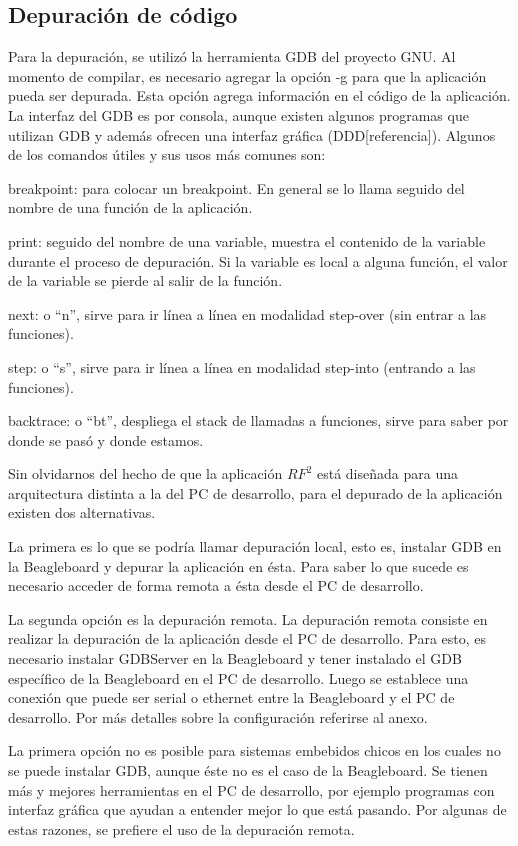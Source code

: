 \subsection{Depuración de código}
Para la depuración, se utilizó la herramienta GDB del proyecto GNU. 
Al momento de compilar, es necesario agregar la opción -g para que la aplicación pueda ser depurada. Esta opción agrega información en el código de la aplicación.
La interfaz del GDB es por consola, aunque existen algunos programas que utilizan GDB y además ofrecen una interfaz gráfica (DDD[referencia]).
Algunos de los comandos útiles y sus usos más comunes son: 

\bigskip
breakpoint: para colocar un breakpoint. En general se lo llama seguido del nombre de una función de la aplicación.

print: seguido del nombre de una variable, muestra el contenido de la variable durante el proceso de depuración. Si la variable es local a alguna función, el valor de la variable se pierde al salir de la función.

next: o “n”, sirve para ir línea a línea en modalidad step-over (sin entrar a las funciones).

step: o “s”, sirve para ir línea a línea en modalidad step-into (entrando a las funciones).

backtrace: o “bt”, despliega el stack de llamadas a funciones, sirve para saber por donde se pasó y donde estamos.

\bigskip
Sin olvidarnos del hecho de que la aplicación $RF^{2}$ está diseñada para una arquitectura distinta a la del PC de desarrollo, para el depurado de la aplicación existen dos alternativas. 

La primera es lo que se podría llamar depuración local, esto es, instalar GDB en la Beagleboard y depurar la aplicación en ésta. Para saber lo que sucede es necesario acceder de forma remota a ésta desde el PC de desarrollo. 

La segunda opción es la depuración remota. La depuración remota consiste en realizar la depuración de la aplicación desde el PC de desarrollo. Para esto, es necesario instalar GDBServer en la Beagleboard y tener instalado el GDB específico de la Beagleboard en el PC de desarrollo. Luego se establece una conexión que puede ser serial o ethernet entre la Beagleboard y el PC de desarrollo. Por más detalles sobre la configuración referirse al anexo.

\bigskip
La primera opción no es posible para sistemas embebidos chicos en los cuales no se puede instalar GDB, aunque éste no es el caso de la Beagleboard. 
Se tienen más y mejores herramientas en el PC de desarrollo, por ejemplo programas con interfaz gráfica que ayudan a entender mejor lo que está pasando. Por algunas de estas razones, se prefiere el uso de la depuración remota. 

